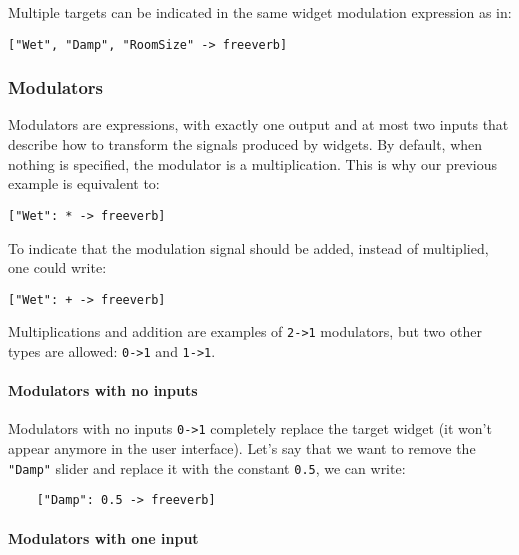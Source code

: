 Multiple targets can be indicated in the same widget modulation expression as in: 

\begin{lstlisting}
["Wet", "Damp", "RoomSize" -> freeverb]
\end{lstlisting}

\subsubsection{Modulators}

Modulators are \faust expressions, with exactly one output and at most two inputs that describe how to transform the signals produced by widgets. By default, when nothing is specified, the modulator is a multiplication. This is why our previous example is equivalent to:

\begin{lstlisting}
["Wet": * -> freeverb]
\end{lstlisting}

To indicate that the modulation signal should be added, instead of multiplied, one could write:
\begin{lstlisting}
["Wet": + -> freeverb]
\end{lstlisting}

Multiplications and addition are examples of \lstinline`2->1` modulators, but two other types are allowed: \lstinline`0->1` and \lstinline`1->1`. 

\paragraph{Modulators with no inputs}

Modulators with no inputs \lstinline`0->1` completely replace the target widget (it won't appear anymore in the user interface). Let's say that we want to remove the \lstinline'"Damp"' slider and replace it with the constant \lstinline`0.5`, we can write:

\begin{lstlisting}
    ["Damp": 0.5 -> freeverb]
\end{lstlisting}
    
\paragraph{Modulators with one input}

